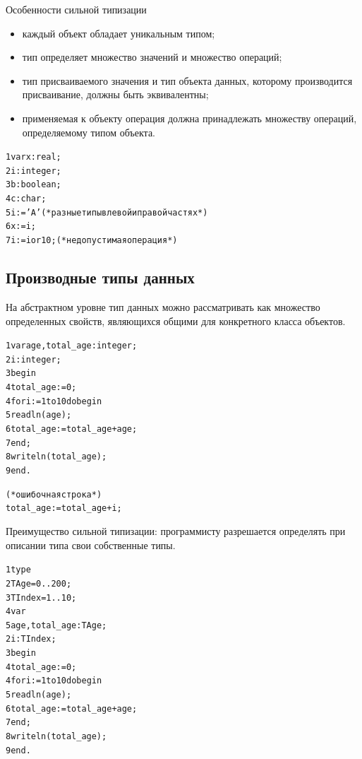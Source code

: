 \documentclass{beamer}
\begin{document}
\begin{frame}[fragile]
\begin{block}{Особенности сильной типизации}
\begin{itemize}
\item каждый объект обладает уникальным типом;
\item тип определяет множество значений и множество операций;
\item тип присваиваемого значения и тип объекта данных, которому производится присваивание, должны быть эквивалентны;
\item применяемая к объекту операция должна принадлежать множеству операций, определяемому типом объекта.
\end{itemize}
\begin{alltt}
1  var x: real;
2      i: integer;
3      b: boolean;
4      c: char;
5  i := 'A' (*разные типы в левой и правой частях*)
6  x := i;
7  i := i or 10; (*недопустимая операция*)
\end{alltt}
\end{block}
\end{frame}   

\subsection{Производные типы данных}
\begin{frame}[fragile]
На абстрактном уровне тип данных можно рассматривать как множество определенных свойств, являющихся общими для конкретного класса
объектов. 

\begin{alltt}
1  var age, total_age : integer;
2    i: integer;
3  begin
4    total_age := 0;
4    for i := 1 to 10 do begin
5      readln(age);
6      total_age := total_age + age;
7    end;
8    writeln(total_age);
9  end.

(* ошибочная строка *)      
      total_age := total_age + i;
\end{alltt}
\end{frame}   

\begin{frame}[fragile]
Преимущество сильной типизации: программисту разрешается определять при описании типа свои собственные типы. 

\begin{alltt}
1  type 
2    TAge = 0..200;
3    TIndex = 1..10;
4  var 
5    age, total_age : TAge;
2    i: TIndex;
3  begin
4    total_age := 0;
4    for i := 1 to 10 do begin
5      readln(age);
6      total_age := total_age + age;
7    end;
8    writeln(total_age);
9  end.
\end{alltt}
\end{frame}
   
\end{document}
